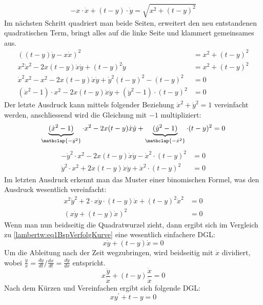\begin{equation}
		-x \cdot \dot{x} + (t-y) \cdot \dot{y}
		= \sqrt{x^2 + (t-y)^2}
		\label{lambertw:eq1BspVerfolgKurve}
\end{equation}
Im nächsten Schritt quadriert man beide Seiten, erweitert den neu entstandenen quadratischen Term, bringt alles auf die linke Seite und klammert gemeinsames aus.
\begin{align*}
	((t-y) \dot{y} - x \dot{x})^2
	&= x^2 + (t-y)^2 \\
	x^2 \dot{x}^2 - 2x(t-y) \dot{x} \dot{y} + (t-y)^2 \dot{y}
	&= x^2 + (t-y)^2 \\
	\dot{x}^2 x^2 - x^2 - 2x(t-y) \dot{x} \dot{y} + \dot{y}^2 (t-y)^2 - (t-y)^2
	&= 0 \\
	(\dot{x}^2 - 1) \cdot x^2 - 2x(t-y) \dot{x} \dot{y} + (\dot{y}^2 - 1) \cdot (t-y)^2
	&= 0
\end{align*}
Der letzte Ausdruck kann mittels folgender Beziehung \(\dot{x}^2 + \dot{y}^2 = 1\) vereinfacht werden, anschliessend wird die Gleichung mit \(-1\) multipliziert:
\[
	\underbrace{(\dot{x}^2 - 1)}_{\mathclap{-\dot{y}^2}} \cdot x^2 - 2x(t-y) \dot{x} \dot{y} + \underbrace{(\dot{y}^2 - 1)}_{\mathclap{-\dot{x}^2}} \cdot (t-y)^2
	= 0
\]
\begin{align*}
	- \dot{y}^2 \cdot x^2 - 2x(t-y) \dot{x} \dot{y} - \dot{x}^2 \cdot (t-y)^2
	&= 0 \\
	\dot{y}^2 \cdot x^2 + 2x(t-y) \dot{x} \dot{y} + \dot{x}^2 \cdot (t-y)^2
	&= 0
\end{align*}
Im letzten Ausdruck erkennt man das Muster einer binomischen Formel, was den Ausdruck wesentlich vereinfacht:
\begin{align*}
	x^2 \dot{y}^2  + 2 \cdot x \dot{y} \cdot (t-y) \dot{x}  + (t-y)^2 \dot{x}^2
	&= 0 \\
	(x \dot{y} + (t-y) \dot{x})^2
	&= 0
\end{align*}
Wenn man nun beidseitig die Quadratwurzel zieht, dann ergibt sich im Vergleich zu \eqref{lambertw:eq1BspVerfolgKurve} eine wesentlich einfachere DGL:
\begin{equation}
	x \dot{y} + (t-y) \dot{x}
	= 0
	\label{lambertw:equation5}
\end{equation}
Um die Ableitung nach der Zeit wegzubringen, wird beidseitig mit \(\dot{x}\) dividiert, wobei \(\frac{\dot{y}}{\dot{x}} = \frac{dy}{dt}/\frac{dx}{dt} = \frac{dy}{dx}\) entspricht.
\[
	x \frac{\dot{y}}{\dot{x}} + (t-y) \frac{\dot{x}}{\dot{x}}
	= 0
\]
Nach dem Kürzen und Vereinfachen ergibt sich folgende DGL:
\begin{equation}
	x y^{\prime} + t - y
	= 0
	\label{lambertw:DGLmitT}
\end{equation}
